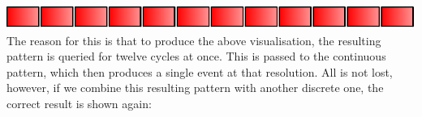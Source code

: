\begin{Shaded}
\begin{Highlighting}[]
\OtherTok{=}\OperatorTok{\textless{}$\textgreater{}}\OperatorTok{\textless{}*\textgreater{}\textgreater{}}\OperatorTok{\textless{}*\textgreater{}\textgreater{}}
\end{Highlighting}
\end{Shaded}

\includegraphics{../figures/fig8.pdf}\\

The reason for this is that to produce the above visualisation, the
resulting pattern is queried for twelve cycles at once. This is passed
to the continuous pattern, which then produces a single event at that
resolution. All is not lost, however, if we combine this resulting
pattern with another discrete one, the correct result is shown again:

\begin{Shaded}
\begin{Highlighting}[]
\OtherTok{=}\NormalTok{) }\OperatorTok{$}
         \OtherTok{{-}\textgreater{}}
         \OtherTok{{-}\textgreater{}}
         \OtherTok{{-}\textgreater{}}  \OperatorTok{$}\OperatorTok{+}\NormalTok{)}\OperatorTok{/}
\end{Highlighting}
\end{Shaded}

